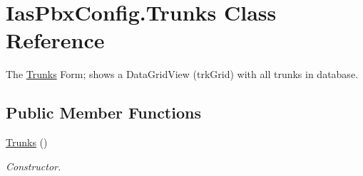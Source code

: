 \hypertarget{class_ias_pbx_config_1_1_trunks}{
\section{IasPbxConfig.Trunks Class Reference}
\label{class_ias_pbx_config_1_1_trunks}
}


The \hyperlink{class_ias_pbx_config_1_1_trunks}{Trunks} Form; shows a DataGridView (trkGrid) with all trunks in database.  
\subsection*{Public Member Functions}
\begin{DoxyCompactItemize}
\item 
\hyperlink{class_ias_pbx_config_1_1_trunks_a8cb3b643f7704d55d9b3857e064c0132}{Trunks} ()
\begin{DoxyCompactList}\small\item\em Constructor. \item\end{DoxyCompactList}\end{DoxyCompactItemize}

